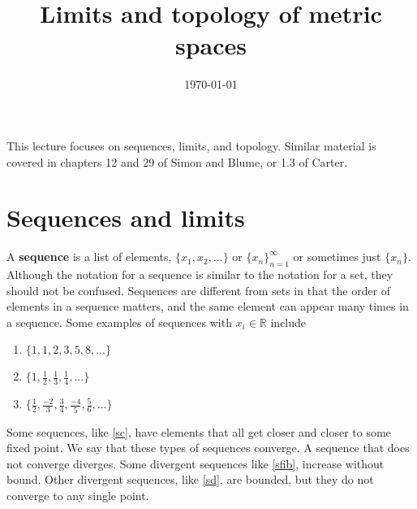 \documentclass[12pt,reqno]{amsart}
\title{Limits and topology of metric spaces}
\date{\today}
\theoremstyle{definition}
\def\R{\mathbb{R}}
\newcommand{\seq}[1]{\{{#1}_n \}_{n=1}^\infty }
\begin{document}
\maketitle

This lecture focuses on sequences, limits, and topology. Similar
material is covered in chapters 12 and 29 of Simon and Blume, or 1.3
of Carter. 

\section{Sequences and limits}

A \textbf{sequence} is a list of elements, $\{x_1, x_2, ... \}$ or
$\seq{x}$ or sometimes just $\{x_n\}$. Although the notation for a
sequence is similar to the notation for a set, they should not be
confused. Sequences are different from sets in that the order of
elements in a sequence matters, and the same element can appear many
times in a sequence.  Some examples of sequences with $x_i \in \R$
include
\begin{enumerate}
\item\label{sfib} $\{ 1, 1, 2, 3, 5, 8, ... \}$
\item\label{sc} $\{ 1, \frac{1}{2}, \frac{1}{3}, \frac{1}{4}, ... \}$
\item\label{sd} $\{\frac{1}{2}, \frac{-2}{3}, \frac{3}{4}, \frac{-4}{5},
  \frac{5}{6}, ... \}$
\end{enumerate}
Some sequences, like \ref{sc}, have elements that all get closer and
closer to some fixed point. We say that these types of sequences
converge. A sequence that does not converge diverges. Some divergent
sequences like \ref{sfib}, increase without bound. Other divergent
sequences, like \ref{sd}, are bounded, but they do not converge to any
single point. 
\end{document}
